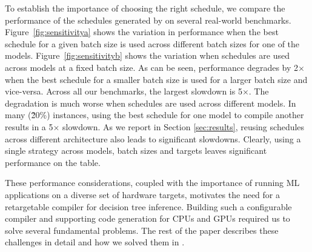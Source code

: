 
To establish the importance of choosing the right schedule, we
compare the performance of the schedules generated by \Treebeard{}
on several real-world benchmarks. 
Figure~\ref{fig:sensitivitya} shows the
variation in performance when the best schedule for a given batch 
size is used across different batch sizes for one of the models. 
Figure~\ref{fig:sensitivityb} shows the variation when schedules 
are used across models at a fixed batch size.
As can be seen, performance degrades by 2$\times$ when the best schedule for a
smaller batch size is used for a larger batch size and vice-versa.
Across all our benchmarks, the largest slowdown is 5$\times$.  %
The degradation is much worse when schedules are used across different models.
In many (\~20\%) instances, using the best schedule for one model 
to compile another results in a 5$\times$ slowdown.
As we report in Section \ref{sec:results}, reusing schedules across
different architecture also leads to significant slowdowns.
Clearly, using a single strategy across models, batch sizes and targets
leaves significant performance on the table. 

These performance considerations, coupled with 
the importance of running ML applications on a diverse set of hardware targets,
motivates the need for a retargetable compiler for decision tree inference.
Building such a configurable compiler and supporting code generation for CPUs and GPUs 
required us to solve several fundamental problems. 
The rest of the paper describes these challenges in detail and how we
solved them in \Treebeard{}.

